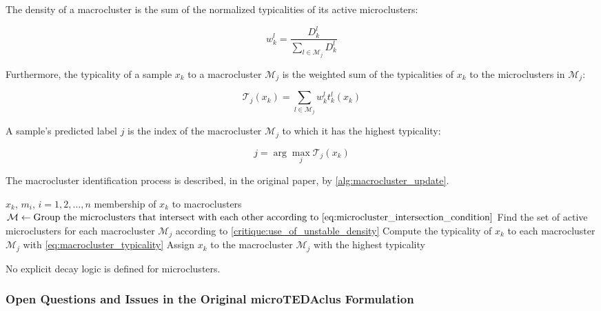 \documentclass[a4paper]{article}
\begin{document}
The density of a macrocluster is the sum of the normalized typicalities of its active microclusters:

\begin{equation}
    w^l_k = \frac{D^l_k}{\sum_{l\in\mathcal{M}_j} D^l_k}
\end{equation}

Furthermore, the typicality of a sample $x_k$ to a macrocluster $\mathcal{M}_j$ is the weighted sum of the typicalities of $x_k$ to the microclusters in $\mathcal{M}_j$:

\begin{equation}
    \mathcal{T}_j(x_k) = \sum_{l\in\mathcal{M}_j} w^l_k t^l_k(x_k) \label{eq:macrocluster_typicality}
\end{equation}

A sample's predicted label $j$ is the index of the macrocluster $\mathcal{M}_j$ to which it has the highest typicality:

\begin{equation}
    j = \arg\max_j \mathcal{T}_j(x_k)
\end{equation}

The macrocluster identification process is described, in the original paper, by \cref{alg:macrocluster_update}.

\begin{algorithm}[H]
\caption{Macrocluster update}
\label{alg:macrocluster_update}
\begin{algorithmic}[1]
\Require $x_k$, $m_i$, $i = 1, 2, \dots, n$
\Ensure membership of $x_k$ to macroclusters
    \State $\mathcal{M} \gets \text{Group the microclusters that intersect with each other according to \cref{eq:microcluster_intersection_condition}}$
    \State Find the set of active microclusters for each macrocluster $\mathcal{M}_j$ according to \cref{critique:use_of_unstable_density}
    \State Compute the typicality of $x_k$ to each macrocluster $\mathcal{M}_j$ with \cref{eq:macrocluster_typicality}
    \State Assign $x_k$ to the macrocluster $\mathcal{M}_j$ with the highest typicality
\EndWhile
\end{algorithmic}
\end{algorithm}

No explicit decay logic is defined for microclusters.

\subsubsection{Open Questions and Issues in the Original microTEDAclus Formulation}
\end{document}
